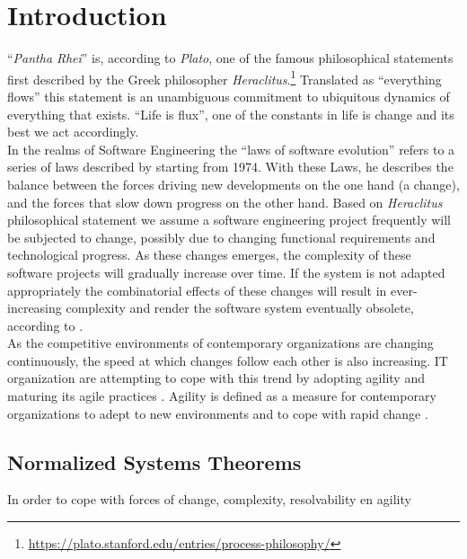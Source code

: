 \chapter{Introduction} \label{introduction}

\enquote{\emph{Pantha Rhei}} is, according to \emph{Plato}, one of the famous
philosophical statements first described by the Greek philosopher
\emph{Heraclitus}.\footnote[1]{\url{https://plato.stanford.edu/entries/process-philosophy/}}
Translated as \enquote{everything flows} this statement is an unambiguous commitment to
ubiquitous dynamics of everything that exists. \enquote{Life is flux}, one of the
constants in life is change and its best we act accordingly.\\

In the realms of Software Engineering the \enquote{laws of software evolution}
\parencite*[]{lehman_programs_1980} refers to a series of laws described by
\citeauthor{lehman_programs_1980} starting from 1974. With these Laws, he describes the
balance between the forces driving new developments on the one hand (a change), and the
forces that slow down progress on the other hand. Based on \emph{Heraclitus} philosophical
statement we assume a software engineering project frequently will be subjected to change,
possibly due to changing functional requirements and technological progress. As these
changes emerges, the complexity of these software projects will gradually increase over
time. If the system is not adapted appropriately the combinatorial effects of these
changes will result in ever-increasing complexity and render the software system
eventually obsolete, according to \citeauthor{lehman_programs_1980}
\parencite*[]{lehman_programs_1980}.\\

As the competitive environments of contemporary organizations are changing continuously,
the speed at which changes follow each other is also increasing. IT organization are
attempting to cope with this trend by adopting agility and maturing its agile practices
\parencite*[]{2024_SIM_key_issues_and_trends}. Agility is defined as a measure for
contemporary organizations to adept to new environments and to cope with rapid change
\parencite*[]{neumann_strategic_1994}.

\section{Normalized Systems Theorems}
In order to cope with forces of change, complexity, resolvability en agility 

